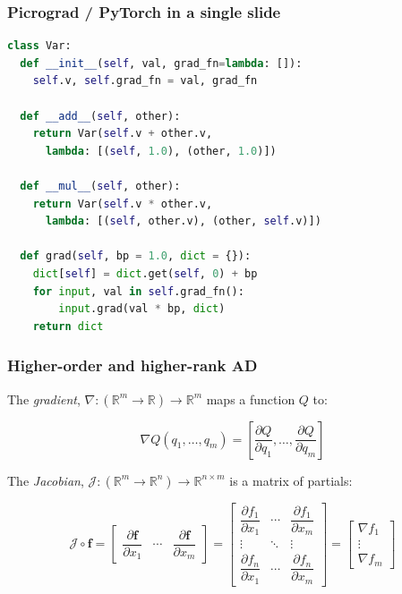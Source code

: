 \documentclass{beamer}
\begin{document}
    \begin{frame}[fragile]
        \frametitle{Picrograd / PyTorch in a single slide}
        \begin{lstlisting}[language=Python, linewidth=1.1\linewidth]
class Var:
  def __init__(self, val, grad_fn=lambda: []):
    self.v, self.grad_fn = val, grad_fn

  def __add__(self, other):
    return Var(self.v + other.v,
      lambda: [(self, 1.0), (other, 1.0)])

  def __mul__(self, other):
    return Var(self.v * other.v,
      lambda: [(self, other.v), (other, self.v)])

  def grad(self, bp = 1.0, dict = {}):
    dict[self] = dict.get(self, 0) + bp
    for input, val in self.grad_fn():
        input.grad(val * bp, dict)
    return dict
        \end{lstlisting}
    \end{frame}

    \begin{frame}
        \frametitle{Higher-order and higher-rank AD}

        The \textit{gradient}, $\nabla: (\mathbb{R}^m\rightarrow\mathbb{R})\rightarrow\mathbb{R}^m$ maps a function $Q$ to:

        \begin{equation*}
            \nabla Q(q_1, \dots, q_m) = \left[ \frac{\partial Q}{\partial q_1}, \dots, \frac{\partial Q}{\partial q_m}\right]
        \end{equation*}

        The \textit{Jacobian}, $\mathcal{J}: (\mathbb{R}^m\rightarrow\mathbb{R}^n)\rightarrow\mathbb{R}^{n \times m}$ is a matrix of partials:

        \begin{equation*}
            \mathcal{J}\circ\mathbf{f} =
            \begin{bmatrix}
                \dfrac{\partial \mathbf{f}}{\partial x_1} & \cdots & \dfrac{\partial \mathbf{f}}{\partial x_m}
            \end{bmatrix} =
            \begin{bmatrix}
                \dfrac{\partial f_1}{\partial x_1} & \cdots & \dfrac{\partial f_1}{\partial x_m}\\
                \vdots & \ddots & \vdots\\
                \dfrac{\partial f_n}{\partial x_1} & \cdots & \dfrac{\partial f_n}{\partial x_m}
            \end{bmatrix} =
            \begin{bmatrix}
                \nabla f_1 \\
                \vdots \\
                \nabla f_m
            \end{bmatrix}
        \end{equation*}
    \end{frame}
\end{document}
